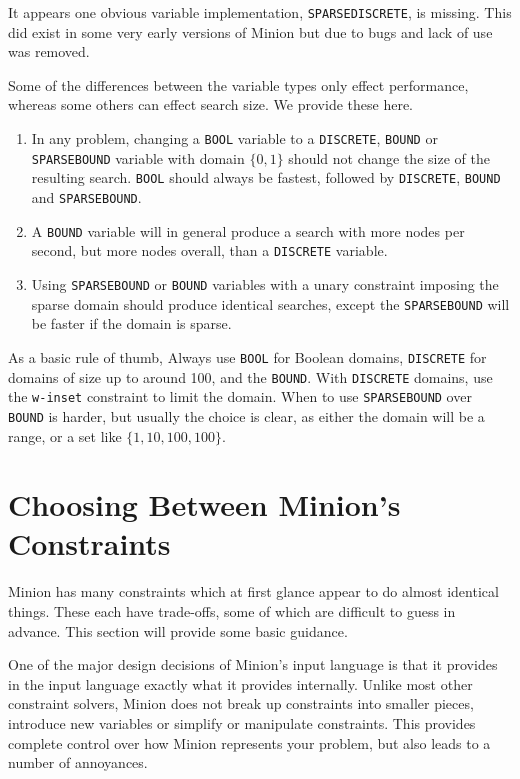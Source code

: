\documentclass[oneside]{book}
\newcommand{\BOOL}{\texttt{BOOL}\xspace}
\newcommand{\DISCRETE}{\texttt{DISCRETE}\xspace}
\newcommand{\BOUND}{\texttt{BOUND}\xspace}
\newcommand{\SPARSEBOUND}{\texttt{SPARSEBOUND}\xspace}
\begin{document}
It appears one obvious variable implementation, \texttt{SPARSEDISCRETE}, is missing. This did exist in some very early versions of Minion but due to bugs and lack of use was removed. 

Some of the differences between the variable types only effect performance, whereas some others can effect search size. We provide these here.

\begin{enumerate}
\item In any problem, changing a \BOOL variable to a \DISCRETE, \BOUND or \SPARSEBOUND variable with domain \(\{0,1\}\) should not change the size of the resulting search. \BOOL should always be fastest, followed by \DISCRETE, \BOUND and \SPARSEBOUND.

\item A \BOUND variable will in general produce a search with more nodes per second, but more nodes overall, than a \DISCRETE variable.

\item Using \SPARSEBOUND or \BOUND variables with a unary constraint imposing the sparse domain should produce identical searches, except the \SPARSEBOUND will be faster if the domain is sparse. 
\end{enumerate}

As a basic rule of thumb, Always use \BOOL for Boolean domains, \DISCRETE for domains of size up to around 100, and the \BOUND. With \DISCRETE domains, use the \texttt{w-inset} constraint to limit the domain. When to use \SPARSEBOUND over \BOUND is harder, but usually the choice is clear, as either the domain will be a range, or a set like \(\{1,10,100,100\}\).

\section{Choosing Between Minion's Constraints}

Minion has many constraints which at first glance appear to do almost identical things. These each have trade-offs, some of which are difficult to guess in advance. This section will provide some basic guidance.

One of the major design decisions of Minion's input language is that it provides in the input language exactly what it provides internally. Unlike most other constraint solvers, Minion does not break up constraints into smaller pieces, introduce new variables or simplify or manipulate constraints. This provides complete control over how Minion represents your problem, but also leads to a number of annoyances.
\end{document}
